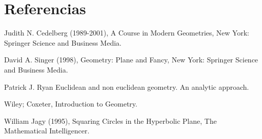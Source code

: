 \documentclass{article}
\theoremstyle{plain}
\theoremstyle{definition}
\theoremstyle{remark}
\begin{document}
\section{Referencias}
\begin{thebibliography}{9}

  Judith N. Cedelberg (1989-2001),
  A Course in Modern Geometries,
  New York: Springer Science and Business Media.

  David A. Singer (1998),
  Geometry: Plane and Fancy,
  New York: Springer Science and Business Media.

  Patrick J. Ryan
  Euclidean and non euclidean geometry. An analytic approach.

  Wiley; Coxeter,
  Introduction to Geometry.

  William Jagy (1995),
  Squaring Circles in the Hyperbolic Plane,
  The Mathematical Intelligencer.
  
\end{thebibliography}
\end{document}
